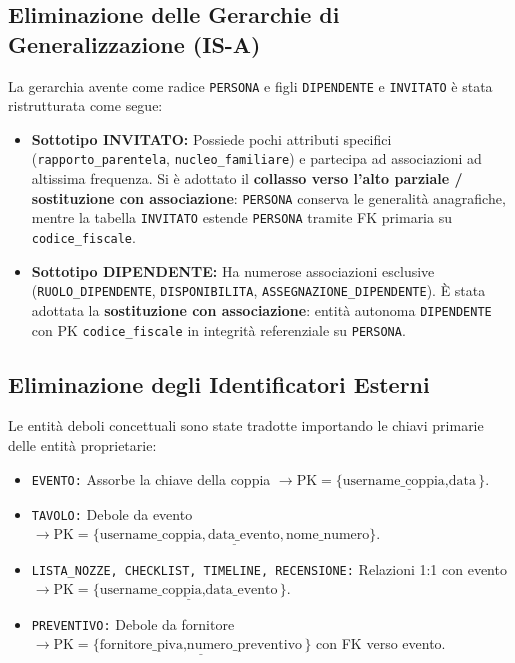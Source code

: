 \subsection{Eliminazione delle Gerarchie di Generalizzazione (IS-A)}
La gerarchia avente come radice \texttt{PERSONA} e figli \texttt{DIPENDENTE} e \texttt{INVITATO} è stata ristrutturata come segue:
\begin{itemize}
    \item \textbf{Sottotipo INVITATO:} Possiede pochi attributi specifici (\texttt{rapporto\_parentela}, \texttt{nucleo\_familiare}) e partecipa ad associazioni ad altissima frequenza. Si è adottato il \textbf{collasso verso l'alto parziale / sostituzione con associazione}: \texttt{PERSONA} conserva le generalità anagrafiche, mentre la tabella \texttt{INVITATO} estende \texttt{PERSONA} tramite FK primaria su \texttt{codice\_fiscale}.
    \item \textbf{Sottotipo DIPENDENTE:} Ha numerose associazioni esclusive (\texttt{RUOLO\_DIPENDENTE}, \texttt{DISPONIBILITA}, \texttt{ASSEGNAZIONE\_DIPENDENTE}). È stata adottata la \textbf{sostituzione con associazione}: entità autonoma \texttt{DIPENDENTE} con PK \texttt{codice\_fiscale} in integrità referenziale su \texttt{PERSONA}.
\end{itemize}

\subsection{Eliminazione degli Identificatori Esterni}
Le entità deboli concettuali sono state tradotte importando le chiavi primarie delle entità proprietarie:
\begin{itemize}[noitemsep]
    \item \texttt{EVENTO:} Assorbe la chiave della coppia $\rightarrow \text{PK} = \{\underline{\text{username\_coppia}, \text{data}}\}$.
    \item \texttt{TAVOLO:} Debole da evento $\rightarrow \text{PK} = \{\underline{\text{username\_coppia}, \text{data\_evento}, \text{nome\_numero}}\}$.
    \item \texttt{LISTA\_NOZZE, CHECKLIST, TIMELINE, RECENSIONE:} Relazioni 1:1 con evento $\rightarrow \text{PK} = \{\underline{\text{username\_coppia}, \text{data\_evento}}\}$.
    \item \texttt{PREVENTIVO:} Debole da fornitore $\rightarrow \text{PK} = \{\underline{\text{fornitore\_piva}, \text{numero\_preventivo}}\}$ con FK verso evento.
\end{itemize}

